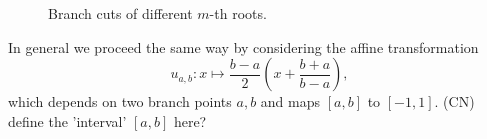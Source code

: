 \documentclass[main.tex]{subfiles}
\begin{document}
  \begin{figure}[H]
      \begin{center}
      \end{center}
      \caption{Branch cuts of different $m$-th roots.}
  \label{fig:mth_root_pol} \end{figure}

  In general we proceed the same way by considering the affine 
  transformation
  \begin{equation}
      \label{def:uab}
      u_{a,b} : x \mapsto \frac{b-a}{2}\left(x+\frac{b+a}{b-a}\right),
  \end{equation}
  which depends on two branch points $a,b$ and maps $[a,b]$ to $[-1,1]$.
  \todo (CN) define the 'interval' $[a,b]$ here?
  
\end{document}

